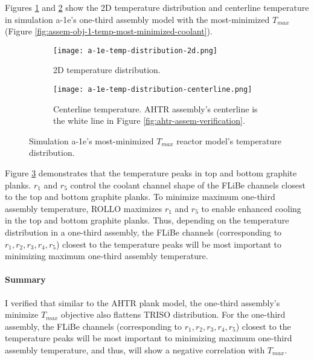 Figures \ref{fig:a-1e-temp-distribution-2d} and \ref{fig:a-1e-temp-distribution-centerline}
show the 2D temperature distribution and centerline temperature in simulation a-1e's 
one-third assembly model with the most-minimized $T_{max}$ (Figure 
\ref{fig:assem-obj-1-temp-most-minimized-coolant}). 
\begin{figure}[htbp!]
    \begin{subfigure}{\textwidth}
        \centering
        \texttt{[image: a-1e-temp-distribution-2d.png]}
        \caption{2D temperature distribution.}
        \label{fig:a-1e-temp-distribution-2d} 
    \end{subfigure}
    \begin{subfigure}{\textwidth}
        \centering
        \texttt{[image: a-1e-temp-distribution-centerline.png]}
        \caption{Centerline temperature. AHTR assembly's centerline is the white line 
        in Figure \ref{fig:ahtr-assem-verification}.}
        \label{fig:a-1e-temp-distribution-centerline} 
    \end{subfigure}
    \caption{Simulation a-1e's most-minimized $T_{max}$ reactor model's temperature 
    distribution.}
    \label{fig:a-1e-temp-distribution}
\end{figure}

Figure \ref{fig:a-1e-temp-distribution} demonstrates that the temperature peaks in 
top and bottom graphite planks. 
$r_1$ and $r_5$ control the coolant channel shape of the \gls{FLiBe} channels closest 
to the top and bottom graphite planks. 
To minimize maximum one-third assembly temperature, \gls{ROLLO} maximizes 
$r_1$ and $r_5$ to enable enhanced cooling in the top and bottom graphite planks. 
Thus, depending on the temperature distribution in a one-third assembly, the FLiBe 
channels (corresponding to $r_1, r_2, r_3, r_4, r_5$) closest to the temperature peaks 
will be most important to minimizing maximum one-third assembly temperature. 

\paragraph{Summary}
I verified that similar to the \gls{AHTR} plank model, the one-third assembly's 
minimize $T_{max}$ objective also flattens TRISO distribution. 
For the one-third assembly, the FLiBe channels (corresponding to $r_1, r_2, r_3, r_4, 
r_5$) closest to the temperature peaks will be most important to minimizing maximum
one-third assembly temperature, and thus, will show a negative correlation with 
$T_{max}$. 

